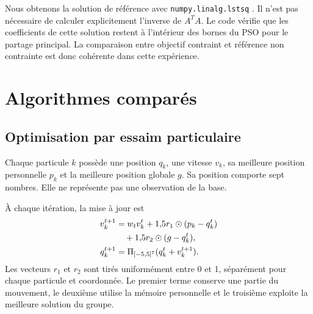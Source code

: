 \documentclass[conference,a4paper]{IEEEtran}
\begin{document}
Nous obtenons la solution de référence avec \texttt{numpy.linalg.lstsq} \cite{lstsq}. Il n'est pas nécessaire de calculer explicitement l'inverse de $A^TA$. Le code vérifie que les coefficients de cette solution restent à l'intérieur des bornes du PSO pour le partage principal. La comparaison entre objectif contraint et référence non contrainte est donc cohérente dans cette expérience.

\section{Algorithmes comparés}
\subsection{Optimisation par essaim particulaire}
Chaque particule $k$ possède une position $q_k$, une vitesse $v_k$, sa meilleure position personnelle $p_k$ et la meilleure position globale $g$. Sa position comporte sept nombres. Elle ne représente pas une observation de la base.

À chaque itération, la mise à jour est
\begin{align}
v_k^{t+1}&=w_tv_k^t+1{,}5r_1\odot(p_k-q_k^t)\notag\\
&\quad+1{,}5r_2\odot(g-q_k^t),\\
q_k^{t+1}&=\Pi_{[-5,5]^7}(q_k^t+v_k^{t+1}).
\end{align}
Les vecteurs $r_1$ et $r_2$ sont tirés uniformément entre 0 et 1, séparément pour chaque particule et coordonnée. Le premier terme conserve une partie du mouvement, le deuxième utilise la mémoire personnelle et le troisième exploite la meilleure solution du groupe.
\end{document}
